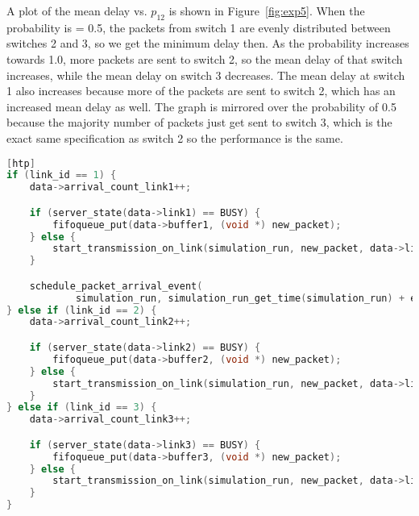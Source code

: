 A plot of the mean delay vs. $p_{12}$ is shown in Figure~\ref{fig:exp5}. When the probability is = 0.5, the packets from switch 1 are evenly distributed between switches 2 and 3, so we get the minimum delay then. As the probability increases towards 1.0, more packets are sent to switch 2, so the mean delay of that switch increases, while the mean delay on switch 3 decreases. The mean delay at switch 1 also increases because more of the packets are sent to switch 2, which has an increased mean delay as well. The graph is mirrored over the probability of 0.5 because the majority number of packets just get sent to switch 3, which is the exact same specification as switch 2 so the performance is the same.

\begin{lstlisting}[language=C, caption={Modifications to Experiment 5 Code}, label={list:exp5}][htp]
if (link_id == 1) {
    data->arrival_count_link1++;

    if (server_state(data->link1) == BUSY) {
        fifoqueue_put(data->buffer1, (void *) new_packet);
    } else {
        start_transmission_on_link(simulation_run, new_packet, data->link1);
    }

    schedule_packet_arrival_event(
            simulation_run, simulation_run_get_time(simulation_run) + exponential_generator((double) 1 / LINK1_PACKET_ARRIVAL_RATE), 1);
} else if (link_id == 2) {
    data->arrival_count_link2++;

    if (server_state(data->link2) == BUSY) {
        fifoqueue_put(data->buffer2, (void *) new_packet);
    } else {
        start_transmission_on_link(simulation_run, new_packet, data->link2);
    }
} else if (link_id == 3) {
    data->arrival_count_link3++;

    if (server_state(data->link3) == BUSY) {
        fifoqueue_put(data->buffer3, (void *) new_packet);
    } else {
        start_transmission_on_link(simulation_run, new_packet, data->link3);
    }
}
\end{lstlisting}


